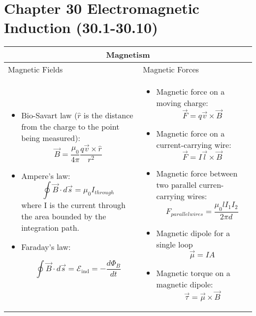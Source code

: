 \documentclass{article}
\begin{document}
\LARGE 
\section*{Chapter 30 Electromagnetic Induction (30.1-30.10)}

\normalsize

\begin{center}
	\begin{tabular}{|p{8cm}|p{8cm}|}
		\hline
		\multicolumn{2}{|c|}{Magnetism}                                                     \\
		\hline

		Magnetic Fields & Magnetic Forces                                                   \\

		\begin{itemize}
			\item Bio-Savart law ($ \hat{r}$ is the distance from the charge to the point being measured):
			      \[ \vec{B} = \frac{\mu_0}{4\pi} \frac{q\vec{v} \times \hat{r}}{r^2} \]
			\item Ampere's law:
			      \[ \oint \vec{B} \cdot d \vec{s} = \mu_0 I_{through} \]
			      where I is the current through the area bounded by the integration path.

			\item Faraday's law:

			      \[ \oint \vec B \cdot d \vec s = \mathcal{E}_\text{ind} = - \frac{d \Phi_B}{dt} \]
		\end{itemize}

		                &

		\begin{itemize}
			\item Magnetic force on a moving charge:
			      \[ \vec{F} = q\vec{v} \times \vec{B} \]
			\item Magnetic force on a current-carrying wire:
			      \[ \vec{F} = I\vec{l} \times \vec{B} \]
			\item Magnetic force between two parallel curren-carrying wires:
			      \[ F_{parallel wires} = \frac{\mu_0 l I_1 I_2}{2 \pi d}\]
			\item Magnetic dipole for a single loop \[\vec{\mu} = IA\]
			\item Magnetic torque on a magnetic dipole:
			      \[ \vec{\tau} = \vec{\mu} \times \vec{B}\]
		\end{itemize} \\
		\hline


\end{tabular}
\end{center}
\end{document}
